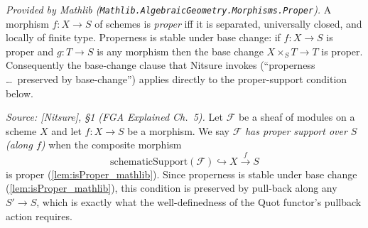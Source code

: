 \begin{lemma}
  \label{lem:isProper_mathlib}
  \mathlibok
  \textit{Provided by Mathlib
  (\texttt{Mathlib.AlgebraicGeometry.Morphisms.Proper}).}
  A morphism \(f : X \to S\) of schemes is \emph{proper} iff it is separated,
  universally closed, and locally of finite type. Properness is stable under base
  change: if \(f : X \to S\) is proper and \(g : T \to S\) is any morphism then
  the base change \(X \times_S T \to T\) is proper. Consequently the base-change
  clause that Nitsure invokes (``properness \ldots\ preserved by base-change'')
  applies directly to the proper-support condition below.
\end{lemma}

\begin{definition}

  \label{def:has_proper_support}
  \textit{Source: [Nitsure], \S 1 (FGA Explained Ch.~5).}
  Let \(\mathcal{F}\) be a sheaf of modules on a scheme \(X\) and let
  \(f : X \to S\) be a morphism. We say \(\mathcal{F}\) \emph{has proper support
  over \(S\) (along \(f\))} when the composite morphism
  \[
    \mathrm{schematicSupport}(\mathcal{F}) \hookrightarrow X \xrightarrow{f} S
  \]
  is proper (\cref{lem:isProper_mathlib}). Since properness is stable under base
  change (\cref{lem:isProper_mathlib}), this condition is preserved by pull-back
  along any \(S'\to S\), which is exactly what the well-definedness of the Quot
  functor's pullback action requires.
\end{definition}

